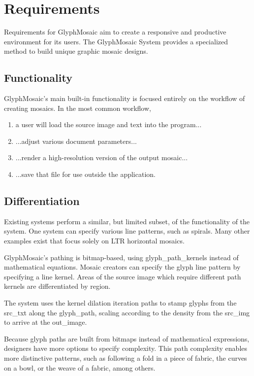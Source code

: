 \section{Requirements}
Requirements for GlyphMosaic aim to create a responsive and productive environment for its users.
The GlyphMosaic System provides a specialized method to build unique graphic mosaic designs.


\subsection{Functionality}
GlyphMosaic’s main built-in functionality is focused entirely on the workflow of creating mosaics.
In the most common workflow,
\begin{enumerate}
      \item a user will load the source image and text into the program...
      \item ...adjust various document parameters...
      \item ...render a high-resolution version of the output mosaic...
      \item ...save that file for use outside the application.
\end{enumerate}


\subsection{Differentiation}
Existing systems perform a similar, but limited subset, of the functionality of the system.
One system can specify various line patterns, such as spirals.
Many other examples exist that focus solely on LTR horizontal mosaics.

GlyphMosaic's pathing is \gls{bitmap}-based, using \glspl{glyph_path_kernel} instead of mathematical equations.
Mosaic creators can specify the glyph line pattern by specifying a line kernel.
Areas of the source image which require different path kernels are differentiated by region.

The system uses the kernel dilation iteration paths to stamp glyphs from the \gls{src_txt} along the \gls{glyph_path}, scaling according to the \gls{density} from the \gls{src_img} to arrive at the \gls{out_image}.

Because glyph paths are built from bitmaps instead of mathematical expressions, designers have more options to specify complexity.
This path complexity enables more distinctive patterns, such as following a fold in a piece of fabric, the curves on a bowl, or the weave of a fabric, among others.

